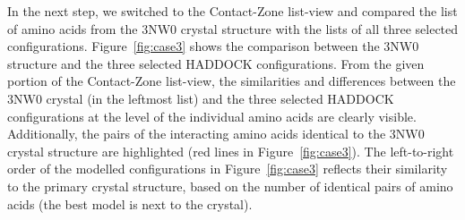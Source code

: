 \documentclass{bmcart}
\def\MatView {Matrix view\xspace}
\def\CoZoListView {Contact-Zone list-view\xspace}
\begin{document}

In the next step, we switched to the \CoZoListView and compared the list of amino acids from the 3NW0 crystal structure with the lists of all three selected configurations.
Figure~\ref{fig:case3} shows the comparison between the 3NW0 structure and the three selected HADDOCK configurations.
From the given portion of the \CoZoListView, the similarities and differences between the 3NW0 crystal (in the leftmost list) and the three selected HADDOCK configurations at the level of the individual amino acids are clearly visible.
Additionally, the pairs of the interacting amino acids identical to the 3NW0 crystal structure are highlighted (red lines in Figure~\ref{fig:case3}). 
The left-to-right order of the modelled configurations in Figure~\ref{fig:case3} reflects their similarity to the primary crystal structure, based on the number of identical pairs of amino acids (the best model is next to the crystal).


\end{document}
